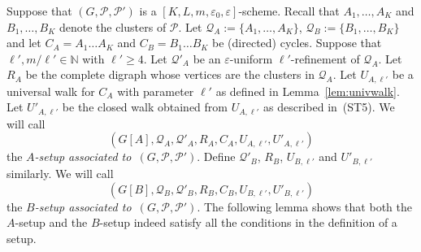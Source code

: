 \documentclass{memo-l}
\def\COMMENT#1{}
\def\eps{\varepsilon}
\numberwithin{section}{chapter}
\numberwithin{equation}{section}
\numberwithin{firstthm}{section}
\numberwithin{figure}{section}
\begin{document}
Suppose that $(G,\mathcal{P},\mathcal{P}')$ is a $[K,L,m,\eps_0,\eps]$-scheme.
Recall that $A_1,\dots,A_K$ and $B_1,\dots,B_K$ denote the clusters of $\mathcal{P}$.
Let $\mathcal{Q}_{A}:=\{A_1,\dots,A_K\}$, $\mathcal{Q}_{B}:=\{B_1,\dots,B_K\}$ and let $C_A = A_1 \dots A_K$ and $C_B = B_1 \dots B_K$ be (directed)
cycles. Suppose that $\ell',m/\ell'\in\mathbb{N}$ with $\ell'\ge 4$.
Let $\mathcal{Q}'_{A}$ be an $\eps$-uniform $\ell'$-refinement of $\mathcal{Q}_A$.
Let $R_{A}$ be the complete digraph whose vertices are the clusters
in $\mathcal{Q}_A$. 
Let $U_{A,\ell'}$ be a universal walk for $C_A$ with parameter $\ell'$ as defined in Lemma~\ref{lem:univwalk}.
Let $U'_{A,\ell'}$ be the closed walk obtained from $U_{A,\ell'}$ as described in~(ST5).
 We will call
$$
(G[A], \mathcal{Q}_A , \mathcal{Q}'_A ,R_{A},C_{A},U_{A,\ell'},U'_{A,\ell'})$$ the \emph{$A$-setup
associated to~$(G, \mathcal{P},\mathcal{P}')$}. 
Define $\mathcal{Q}'_{B}$,  $R_B$, $U_{B,\ell'}$ and $U'_{B,\ell'}$ similarly. We will call
$$
(G[B], \mathcal{Q}_B , \mathcal{Q}'_B ,R_{B},C_{B},U_{B,\ell'},U'_{B,\ell'})$$ the \emph{$B$-setup
associated to~$(G, \mathcal{P},\mathcal{P}')$}. 
The following lemma shows that both the $A$-setup and the $B$-setup indeed satisfy all the conditions in the definition of a setup.%
    \COMMENT{Daniela: added $1/K$ into the hierarchy of Lemam~\ref{lem:setup} as we need it to apply Lemma~\ref{randompartition}} 
\end{document}
